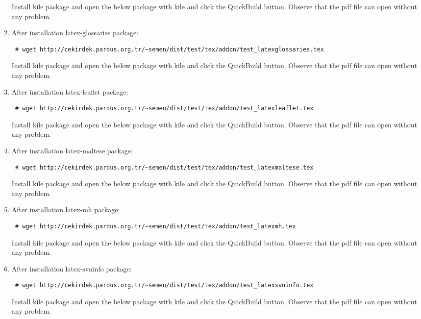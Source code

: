 \documentclass[a4paper,10pt]{article}
\begin{document}
\begin{enumerate}
Install kile package and open the below package with kile and click the QuickBuild button. Observe that the pdf file can open without any problem.
\item After installation latex-glossaries package:
\begin{verbatim}
 # wget http://cekirdek.pardus.org.tr/~semen/dist/test/tex/addon/test_latexglossaries.tex
\end{verbatim}

Install kile package and open the below package with kile and click the QuickBuild button. Observe that the pdf file can open without any problem.
\item After installation latex-leaflet package:
\begin{verbatim}
 # wget http://cekirdek.pardus.org.tr/~semen/dist/test/tex/addon/test_latexleaflet.tex
\end{verbatim}

Install kile package and open the below package with kile and click the QuickBuild button. Observe that the pdf file can open without any problem.
\item After installation latex-maltese package:
\begin{verbatim}
 # wget http://cekirdek.pardus.org.tr/~semen/dist/test/tex/addon/test_latexmaltese.tex
\end{verbatim}

Install kile package and open the below package with kile and click the QuickBuild button. Observe that the pdf file can open without any problem.

\item After installation latex-mh package:
\begin{verbatim}
 # wget http://cekirdek.pardus.org.tr/~semen/dist/test/tex/addon/test_latexmh.tex
\end{verbatim}

Install kile package and open the below package with kile and click the QuickBuild button. Observe that the pdf file can open without any problem.
\item After installation latex-svninfo package:
\begin{verbatim}
 # wget http://cekirdek.pardus.org.tr/~semen/dist/test/tex/addon/test_latexsvninfo.tex
\end{verbatim}

Install kile package and open the below package with kile and click the QuickBuild button. Observe that the pdf file can open without any problem.


\end{enumerate}
\end{document}
